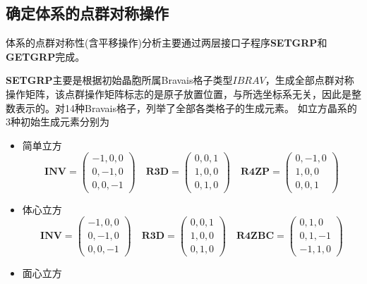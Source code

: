 \subsection{确定体系的点群对称操作}
体系的点群对称性(含平移操作)分析主要通过两层接口子程序\textbf{SETGRP}和\textbf{GETGRP}完成。

\textbf{SETGRP}主要是根据初始晶胞所属\textrm{Bravais}格子类型$\mathit{IBRAV}$，生成全部点群对称操作矩阵，该点群操作矩阵标志的是原子放置位置，与所选坐标系无关，因此是整数表示的。对14种\textrm{Bravais}格子，列举了全部各类格子的生成元素。
如立方晶系的3种初始生成元素分别为
\begin{itemize}
	\item 简单立方
\begin{displaymath}
	\mathbf{INV}=
	\begin{pmatrix}
		-1, 0, 0 \\ 
		0,-1, 0 \\
		0, 0, -1
	\end{pmatrix}\quad
	\mathbf{R3D}=
	\begin{pmatrix}
		0, 0, 1 \\ 
		1, 0, 0 \\
		0, 1, 0
	\end{pmatrix}\quad
	\mathbf{R4ZP}=
	\begin{pmatrix}
		0, -1, 0 \\ 
		1, 0, 0 \\
		0, 0, 1
	\end{pmatrix}
\end{displaymath}
	\item 体心立方
\begin{displaymath}
	\mathbf{INV}=
	\begin{pmatrix}
		-1, 0, 0 \\ 
		0,-1, 0 \\
		0, 0, -1
	\end{pmatrix}\quad
	\mathbf{R3D}=
	\begin{pmatrix}
		0, 0, 1 \\ 
		1, 0, 0 \\
		0, 1, 0
	\end{pmatrix}\quad
	\mathbf{R4ZBC}=
	\begin{pmatrix}
		0, 1, 0 \\ 
		0, 1, -1 \\
		-1, 1, 0
	\end{pmatrix}
\end{displaymath}
	\item 面心立方
\begin{displaymath}

\end{displaymath}
\end{itemize}
